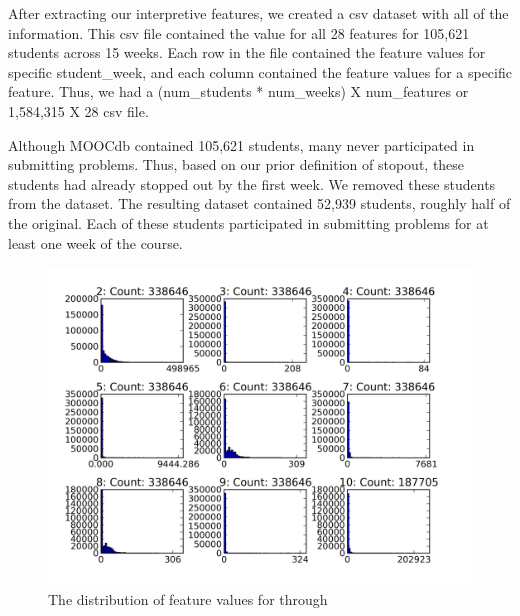 After extracting our interpretive features, we created a csv dataset with all of the information. This csv file contained the value for all 28 features for 105,621 students across 15 weeks. Each row in the file contained the feature values for specific student\_week, and each column contained the feature values for a specific feature. Thus, we had a (num\_students * num\_weeks) X num\_features or 1,584,315 X 28 csv file.

Although MOOCdb contained 105,621 students, many never participated in submitting problems. Thus, based on our prior definition of stopout, these students had already stopped out by the first week. We removed these students from the dataset. The resulting dataset contained 52,939 students, roughly half of the original. Each of these students participated in submitting problems for at least one week of the course.

\begin{figure}[ht!]
  \caption{The distribution of feature values for  through }\label{fig:features_2_10}
  \centering
    \includegraphics[width=1.0\textwidth]{figures/feature_distributions/features_2_10.png}
\end{figure}

